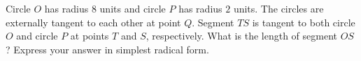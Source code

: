 Circle $O$ has radius $8$ units and circle $P$ has radius $2$ units. The circles are externally tangent to each other at point $Q$. Segment $TS$ is tangent to both circle $O$ and circle $P$ at points $T$ and $S$, respectively. What is the length of segment $OS$? Express your answer in simplest radical form.

